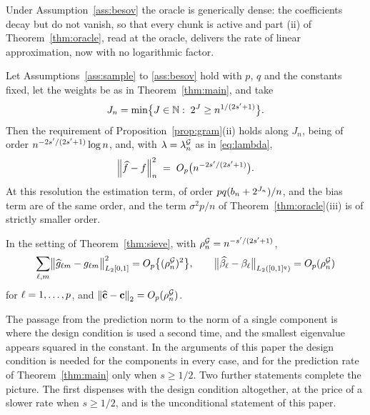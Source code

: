 Under Assumption~\ref{ass:besov} the oracle is generically dense: the
coefficients decay but do not vanish, so that every chunk is
active and part (ii) of
Theorem~\ref{thm:oracle}, read at the oracle, delivers the rate of
linear approximation, now with no logarithmic factor.



\begin{theorem}
\label{thm:sieve}
Let Assumptions~\ref{ass:sample} to \ref{ass:besov} hold with $p$, $q$ and the
constants fixed, let the weights be as in Theorem~\ref{thm:main}, and take
\begin{equation}
  \label{eq:Jn}
  J_n = \min\bigl\{J \in \mathbb{N} :\;
  2^{J} \ge n^{1/(2s'+1)}\bigr\}.
\end{equation}
Then the requirement of Proposition~\ref{prop:gram}(ii) holds along $J_n$,
being of order $n^{-2s'/(2s'+1)}\log n$, and, with $\lambda = \lambda^{\mathcal{G}}_{n}$ as in
\eqref{eq:lambda},
\[
  \left\lVert \widehat{f}-f \right\rVert_{n}^{2}
  \;=\; O_p\bigl(n^{-2s'/(2s'+1)}\bigr) .
\]
At this resolution the estimation term, of order $pq(b_{n} + 2^{J_n})/n$, and
the bias term are of the same order, and the term $\sigma^{2}p/n$ of
Theorem~\ref{thm:oracle}(iii) is of strictly smaller order.
\end{theorem}




\begin{corollary}
\label{cor:components}
In the setting of Theorem~\ref{thm:sieve}, with
$\rho^{\mathcal{G}}_{n} = n^{-s'/(2s'+1)}$,
\[
  \sum_{\ell,m}\bigl\lVert\widehat{g}_{\ell m}-g_{\ell m}
  \bigr\rVert_{L_2[0,1]}^{2} = O_p\bigl\{(\rho^{\mathcal{G}}_{n})^{2}\bigr\},
  \qquad
  \bigl\lVert\widehat{\beta_{\ell}}-\beta_{\ell}
  \bigr\rVert_{L_2([0,1]^{q})} = O_p(\rho^{\mathcal{G}}_{n})
\]
for $\ell = 1,\dots,p$, and $\left\lVert \widehat{\mathbf{c}} - \mathbf{c} \right\rVert_{2} = O_p(\rho^{\mathcal{G}}_{n})$.
\end{corollary}


The passage from the prediction norm to the norm of a single component is
where the design condition is used a second time, and the smallest eigenvalue
appears squared in the constant. In the arguments of this
paper the design condition is needed for the components in every case, and
for the prediction rate of Theorem~\ref{thm:main} only when $s \ge 1/2$.
Two further statements complete the picture.
The first dispenses with the design condition altogether, at the price of a
slower rate when $s \ge 1/2$, and is the unconditional statement of this paper.

